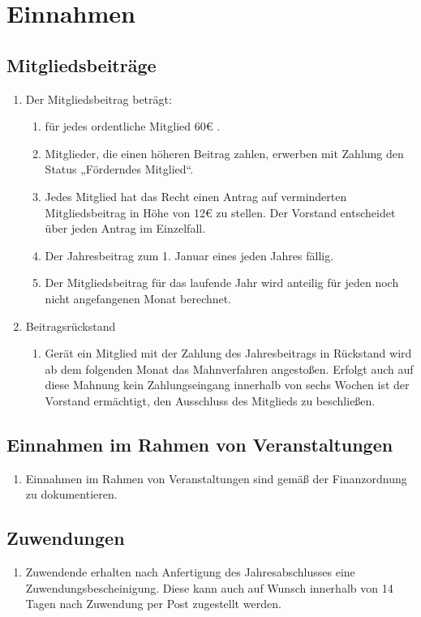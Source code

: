 \documentclass[12pt,a4paper,titlepage]{scrartcl}
\begin{document}
\section{Einnahmen}
\subsection{Mitgliedsbeiträge}
\begin{enumerate}
\item Der Mitgliedsbeitrag beträgt:
	\begin{enumerate}
	\item für jedes ordentliche Mitglied 60€ .
	\item Mitglieder, die einen höheren Beitrag zahlen, erwerben mit Zahlung den Status 
„Förderndes Mitglied“.
	\item Jedes Mitglied hat das Recht einen Antrag auf verminderten Mitgliedsbeitrag in 
Höhe von 12€ zu stellen. Der Vorstand entscheidet über jeden Antrag im 
Einzelfall. 
	\item Der Jahresbeitrag zum 1. Januar eines jeden Jahres fällig. 
	\item Der Mitgliedsbeitrag für das laufende Jahr wird anteilig für jeden noch nicht 
angefangenen Monat berechnet.   
	\end{enumerate}
\item Beitragsrückstand
	\begin{enumerate}
	\item Gerät ein Mitglied mit der Zahlung des Jahresbeitrags in Rückstand 
wird ab dem folgenden Monat das Mahnverfahren angestoßen. Erfolgt 
auch auf diese Mahnung kein Zahlungseingang innerhalb von sechs 
Wochen ist der Vorstand ermächtigt, den Ausschluss des Mitglieds zu 
beschließen.
	\end{enumerate}
\end{enumerate}
\subsection{Einnahmen im Rahmen von Veranstaltungen}
\begin{enumerate}
\item Einnahmen im Rahmen von Veranstaltungen sind gemäß der Finanzordnung zu 
dokumentieren. 	
\end{enumerate}

\subsection{Zuwendungen}
\begin{enumerate}
\item Zuwendende erhalten nach Anfertigung des Jahresabschlusses eine 
Zuwendungsbescheinigung. Diese kann auch auf Wunsch innerhalb von 14 Tagen nach 
Zuwendung per Post zugestellt werden.  
\end{enumerate}
\end{document}
